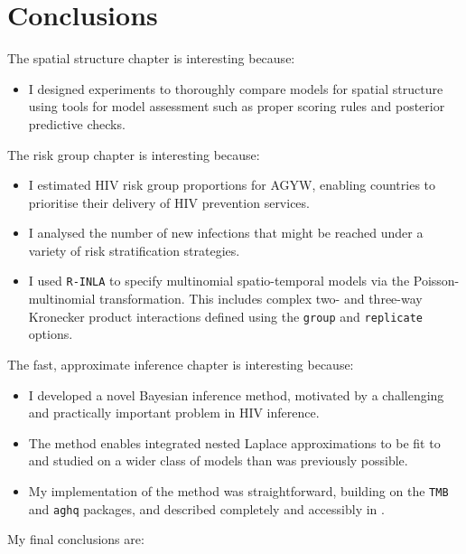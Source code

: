 \documentclass[a4paper, nobind]{templates/ociamthesis}
\providecommand{\tightlist}{%
  \setlength{\itemsep}{0pt}\setlength{\parskip}{0pt}}
\begin{document}
\hypertarget{conclusions-1}{%
\section{Conclusions}\label{conclusions-1}}

The spatial structure chapter is interesting because:

\begin{itemize}
\tightlist
\item
  I designed experiments to thoroughly compare models for spatial structure using tools for model assessment such as proper scoring rules and posterior predictive checks.
\end{itemize}

The risk group chapter is interesting because:

\begin{itemize}
\tightlist
\item
  I estimated HIV risk group proportions for AGYW, enabling countries to prioritise their delivery of HIV prevention services.
\item
  I analysed the number of new infections that might be reached under a variety of risk stratification strategies.
\item
  I used \texttt{R-INLA} to specify multinomial spatio-temporal models via the Poisson-multinomial transformation. This includes complex two- and three-way Kronecker product interactions defined using the \texttt{group} and \texttt{replicate} options.
\end{itemize}

The fast, approximate inference chapter is interesting because:

\begin{itemize}
\tightlist
\item
  I developed a novel Bayesian inference method, motivated by a challenging and practically important problem in HIV inference.
\item
  The method enables integrated nested Laplace approximations to be fit to and studied on a wider class of models than was previously possible.
\item
  My implementation of the method was straightforward, building on the \texttt{TMB} and \texttt{aghq} packages, and described completely and accessibly in \textcite{howes2023fast}.
\end{itemize}

My final conclusions are:
\end{document}
